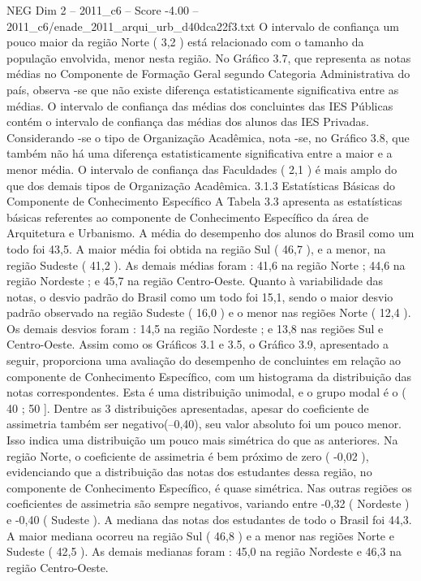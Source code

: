 \begin{textsample}{NEG Dim 2 – 2011\_c6 – Score -4.00 – 2011\_c6/enade\_2011\_arqui\_urb\_d40dca22f3.txt}
O intervalo de confiança um pouco maior da região Norte ( 3,2 ) está relacionado com o tamanho da população envolvida, menor nesta região.
No Gráfico 3.7, que representa as notas médias no Componente de Formação Geral segundo Categoria Administrativa do país, observa -se que não existe diferença estatisticamente significativa entre as médias.
O intervalo de confiança das médias dos concluintes das IES Públicas contém o intervalo de confiança das médias dos alunos das IES Privadas.
Considerando -se o tipo de Organização Acadêmica, nota -se, no Gráfico 3.8, que também não há uma diferença estatisticamente significativa entre a maior e a menor média.
O intervalo de confiança das Faculdades ( 2,1 ) é mais amplo do que dos demais tipos de Organização Acadêmica. 3.1.3 Estatísticas Básicas do Componente de Conhecimento Específico A Tabela 3.3 apresenta as estatísticas básicas referentes ao componente de Conhecimento Específico da área de Arquitetura e Urbanismo.
A média do desempenho dos alunos do Brasil como um todo foi 43,5.
A maior média foi obtida na região Sul ( 46,7 ), e a menor, na região Sudeste ( 41,2 ).
As demais médias foram : 41,6 na região Norte ; 44,6 na região Nordeste ; e 45,7 na região Centro-Oeste.
Quanto à variabilidade das notas, o desvio padrão do Brasil como um todo foi 15,1, sendo o maior desvio padrão observado na região Sudeste ( 16,0 ) e o menor nas regiões Norte ( 12,4 ).
Os demais desvios foram : 14,5 na região Nordeste ; e 13,8 nas regiões Sul e Centro-Oeste.
Assim como os Gráficos 3.1 e 3.5, o Gráfico 3.9, apresentado a seguir, proporciona uma avaliação do desempenho de concluintes em relação ao componente de Conhecimento Específico, com um histograma da distribuição das notas correspondentes.
Esta é uma distribuição unimodal, e o grupo modal é o ( 40 ; 50 ].
Dentre as 3 distribuições apresentadas, apesar do coeficiente de assimetria também ser negativo(–0,40), seu valor absoluto foi um pouco menor.
Isso indica uma distribuição um pouco mais simétrica do que as anteriores.
Na região Norte, o coeficiente de assimetria é bem próximo de zero ( -0,02 ), evidenciando que a distribuição das notas dos estudantes dessa região, no componente de Conhecimento Específico, é quase simétrica.
Nas outras regiões os coeficientes de assimetria são sempre negativos, variando entre -0,32 ( Nordeste ) e -0,40 ( Sudeste ).
A mediana das notas dos estudantes de todo o Brasil foi 44,3.
A maior mediana ocorreu na região Sul ( 46,8 ) e a menor nas regiões Norte e Sudeste ( 42,5 ).
As demais medianas foram : 45,0 na região Nordeste e 46,3 na região Centro-Oeste.

\end{textsample}
